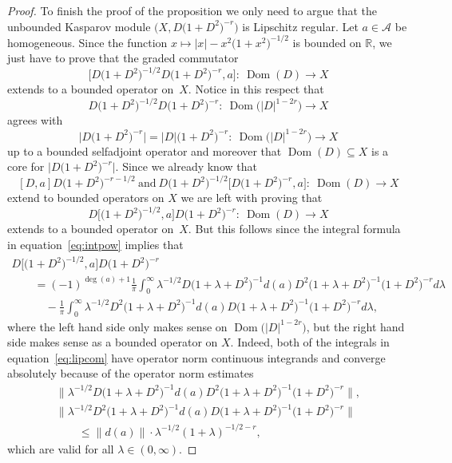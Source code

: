 \documentclass[pdftex]{sigma}
\numberwithin{equation}{section}
\newcommand{\cd}{\cdot}
\newcommand{\la}{\lambda}
\newcommand{\s}[1]{\mathscr{#1}}
\newcommand{\B}[1]{\mathbb{#1}}
\newcommand{\su}{\subseteq}
\begin{document}
\begin{proof}
To finish the proof of the proposition we only need to argue that the unbounded Kasparov module $\big(X,D\big(1 + D^2\big)^{-r}\big)$ is Lipschitz regular. Let $a \in \s A$ be homogeneous. Since the function $x \mapsto |x| - x^2 \big(1 + x^2\big)^{-1/2}$ is bounded on $\B R$, we just have to prove that the graded commutator
\[
\big[ D\big(1 + D^2\big)^{-1/2} D\big(1 + D^2\big)^{-r}, a \big]\colon \ \operatorname{Dom}(D) \to X
\]
extends to a bounded operator on~$X$. Notice in this respect that
\[ D\big(1 + D^2\big)^{-1/2} D\big(1 + D^2\big)^{-r}\colon \ \operatorname{Dom}\big(|D|^{1 - 2r}\big) \to X\] agrees with
\[ \big|D\big(1 + D^2\big)^{-r}\big| = |D|\big(1 + D^2\big)^{-r}\colon \ \operatorname{Dom}\big(|D|^{1-2r}\big) \to X\] up to a bounded selfadjoint operator and moreover that $\operatorname{Dom}(D) \su X$ is a core for $\big|D \big(1 + D^2\big)^{-r}\big|$. Since we already know that
\[
[D,a] D \big(1 + D^2\big)^{-r - 1/2} \ \text{and} \ D\big(1 + D^2\big)^{-1/2} \big[D\big(1 + D^2\big)^{-r}, a\big]\colon \ \operatorname{Dom}(D) \to X
\]
extend to bounded operators on $X$ we are left with proving that
\[
D \big[ \big(1 + D^2\big)^{-1/2}, a\big] D\big(1 + D^2\big)^{-r}\colon \ \operatorname{Dom}(D) \to X
\]
extends to a bounded operator on~$X$. But this follows since the integral formula in equation~\eqref{eq:intpow} implies that
\begin{gather}
 D \big[ \big(1 + D^2\big)^{-1/2}, a\big] D\big(1 + D^2\big)^{-r} \nonumber\\
\qquad{} = (-1)^{\deg (a) + 1} \frac{1}{\pi} \int_0^\infty \la^{-1/2} D \big(1 + \la + D^2\big)^{-1} d(a) D^2 \big(1 + \la + D^2\big)^{-1} \big(1 + D^2\big)^{-r} d\la \nonumber\\
\qquad\quad{}-\frac{1}{\pi} \int_0^\infty \la^{-1/2} D^2 \big(1 + \la + D^2\big)^{-1} d(a) D\big(1 + \la + D^2\big)^{-1}\big(1 + D^2\big)^{-r} d\la ,\label{eq:lipcom}
\end{gather}
where the left hand side only makes sense on $\operatorname{Dom}\big(|D|^{1-2r}\big)$, but the right hand side makes sense as a bounded operator on $X$. Indeed, both of the integrals in equation~\eqref{eq:lipcom} have operator norm continuous integrands and converge absolutely because of the operator norm estimates
\begin{gather*}
 \big\| \la^{-1/2} D \big(1 + \la + D^2\big)^{-1} d(a) D^2 \big(1 + \la + D^2\big)^{-1} \big(1 + D^2\big)^{-r} \big\| , \\
 \big\| \la^{-1/2} D^2 \big(1 + \la + D^2\big)^{-1} d(a) D\big(1 + \la + D^2\big)^{-1}\big(1 + D^2\big)^{-r} \big\| \\
 \qquad{} \leq \| d(a) \| \cd \la^{-1/2} (1 + \la)^{-1/2 - r} ,
\end{gather*}
which are valid for all $\la \in (0,\infty)$.
\end{proof}
\end{document}
